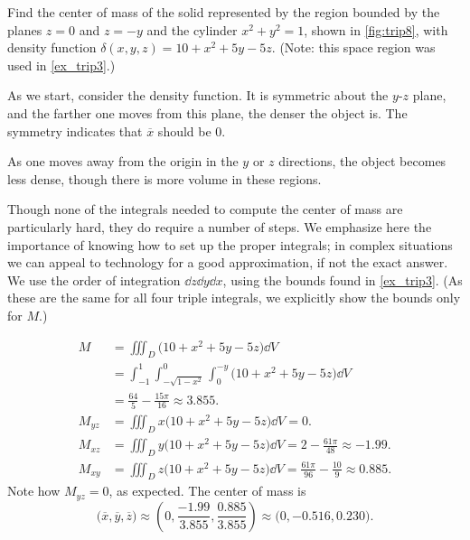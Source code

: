 \begin{example}\label{ex_trip8}%
Find the center of mass of the solid represented by the region bounded by the planes $z=0$ and $z=-y$ and the cylinder $x^2+y^2=1$, shown in \autoref{fig:trip8}, with density function $\delta(x,y,z) = 10+x^2+5y-5z$. (Note: this space region was used in \autoref{ex_trip3}.)

\solution
As we start, consider the density function. It is symmetric about the $y$-$z$ plane, and the farther one moves from this plane, the denser the object is. The symmetry indicates that $\overline x$ should be 0. 

As one moves away from the origin in the $y$ or $z$ directions, the object becomes less dense, though there is more volume in these regions.  

Though none of the integrals needed to compute the center of mass are particularly hard, they do require a number of steps. We emphasize here the importance of knowing how to set up the proper integrals; in complex situations we can appeal to technology for a good approximation, if not the exact answer. We use the order of integration $\dd z\dd y\dd x$, using the bounds found in \autoref{ex_trip3}. (As these are the same for all four triple integrals, we explicitly show the bounds only for $M$.)

\begin{align*}
	M
	&= \iiint_D \bigl(10+x^2+5y-5z\bigr)\dd V \\
	&= \int_{-1}^1\int_{-\sqrt{1-x^2}}^0\int_0^{-y} \bigl(10+x^2+5y-5z\bigr)\dd V\\
	&= \frac{64}5-\frac{15\pi}{16} \approx 3.855.\\
	M_{yz}
	&= \iiint_D x\bigl(10+x^2+5y-5z\bigr)\dd V = 0.\\
	M_{xz}
	&= \iiint_D y\bigl(10+x^2+5y-5z\bigr)\dd V = 2-\frac{61\pi}{48}\approx -1.99.\\
	M_{xy}
	&= \iiint_D z\bigl(10+x^2+5y-5z\bigr)\dd V = \frac{61\pi}{96}-\frac{10}9\approx 0.885.
\end{align*}
Note how $M_{yz}=0$, as expected. The center of mass is
\[
\bigl(\overline{x},\overline{y},\overline{z}\bigr)
\approx \left(0,\frac{-1.99}{3.855},\frac{0.885}{3.855}\right) \approx \bigl(0,-0.516, 0.230\bigr).
\]
\end{example}

